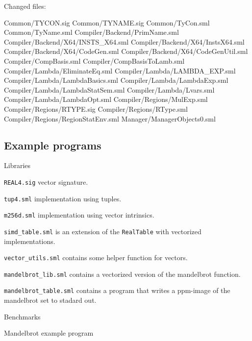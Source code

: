 \documentclass{article}
\begin{document}
Changed files:

Common/TYCON.sig
Common/TYNAME.sig
Common/TyCon.sml
Common/TyName.sml
Compiler/Backend/PrimName.sml
Compiler/Backend/X64/INSTS\_X64.sml
Compiler/Backend/X64/InstsX64.sml
Compiler/Backend/X64/CodeGen.sml
Compiler/Backend/X64/CodeGenUtil.sml
Compiler/CompBasis.sml
Compiler/CompBasisToLamb.sml
Compiler/Lambda/EliminateEq.sml
Compiler/Lambda/LAMBDA\_EXP.sml
Compiler/Lambda/LambdaBasics.sml
Compiler/Lambda/LambdaExp.sml
Compiler/Lambda/LambdaStatSem.sml
Compiler/Lambda/Lvars.sml
Compiler/Lambda/LambdaOpt.sml
Compiler/Regions/MulExp.sml
Compiler/Regions/RTYPE.sig
Compiler/Regions/RType.sml
Compiler/Regions/RegionStatEnv.sml
Manager/ManagerObjects0.sml


\subsection{Example programs}

Libraries

\verb!REAL4.sig! vector signature.

\verb!tup4.sml! implementation using tuples.

\verb!m256d.sml! implementation using vector intrinsics.

\verb!simd_table.sml! is an extension of the \verb!RealTable! with vectorized implementations.

\verb!vector_utils.sml! contains some helper function for vectors.

\verb!mandelbrot_lib.sml! contains a vectorized version of the mandelbrot function.

\verb!mandelbrot_table.sml! contains a program that writes a ppm-image of the mandelbrot set to stadard out.

Benchmarks

Mandelbrot example program
\end{document}
